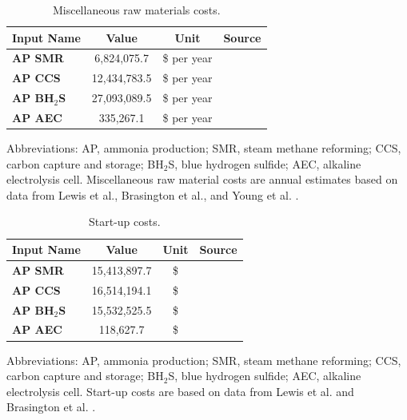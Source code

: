 \documentclass{article}
\begin{document}
\begin{table}[H]
  \centering
  \caption{Miscellaneous raw materials costs.}
  \label{table:miscellaneous_raw_materials_costs}
  \begin{threeparttable}
    \begin{tabular}{@{}lccc@{}}
      \toprule
      \textbf{Input Name} & \textbf{Value} & \textbf{Unit} & \textbf{Source} \\ \midrule
      \textbf{AP SMR} & 6,824,075.7 & \$ per year & \cite{LEWIS2022, Brasington2011, Young2021} \\
      \textbf{AP CCS} & 12,434,783.5 & \$ per year & \cite{LEWIS2022, Brasington2011, Young2021} \\
      \textbf{AP BH$_2$S} & 27,093,089.5 & \$ per year & \cite{LEWIS2022, Brasington2011, Young2021} \\
      \textbf{AP AEC} & 335,267.1 & \$ per year & \cite{LEWIS2022, Brasington2011, Young2021} \\ \bottomrule
    \end{tabular}
\begin{tablenotes}
  \small
  \item Abbreviations: AP, ammonia production; SMR, steam methane reforming; CCS, carbon capture and storage; BH$_2$S, blue hydrogen sulfide; AEC, alkaline electrolysis cell. Miscellaneous raw material costs are annual estimates based on data from Lewis et al., Brasington et al., and Young et al. \cite{LEWIS2022, Brasington2011, Young2021}.
\end{tablenotes}

  \end{threeparttable}
\end{table}

\begin{table}[H]
  \centering
  \caption{Start-up costs.}
  \label{table:startup_costs}
  \begin{threeparttable}
    \begin{tabular}{@{}lccc@{}}
      \toprule
      \textbf{Input Name} & \textbf{Value} & \textbf{Unit} & \textbf{Source} \\ \midrule
      \textbf{AP SMR} & 15,413,897.7 & \$ & \cite{LEWIS2022, Brasington2011} \\
      \textbf{AP CCS} & 16,514,194.1 & \$ & \cite{LEWIS2022, Brasington2011} \\
      \textbf{AP BH$_2$S} & 15,532,525.5 & \$ & \cite{LEWIS2022, Brasington2011} \\
      \textbf{AP AEC} & 118,627.7 & \$ & \cite{LEWIS2022, Brasington2011} \\ \bottomrule
    \end{tabular}
    \begin{tablenotes}
  \small
  \item Abbreviations: AP, ammonia production; SMR, steam methane reforming; CCS, carbon capture and storage; BH$_2$S, blue hydrogen sulfide; AEC, alkaline electrolysis cell. Start-up costs are based on data from Lewis et al. and Brasington et al. \cite{LEWIS2022, Brasington2011}.
\end{tablenotes}

  \end{threeparttable}
\end{table}
\end{document}
